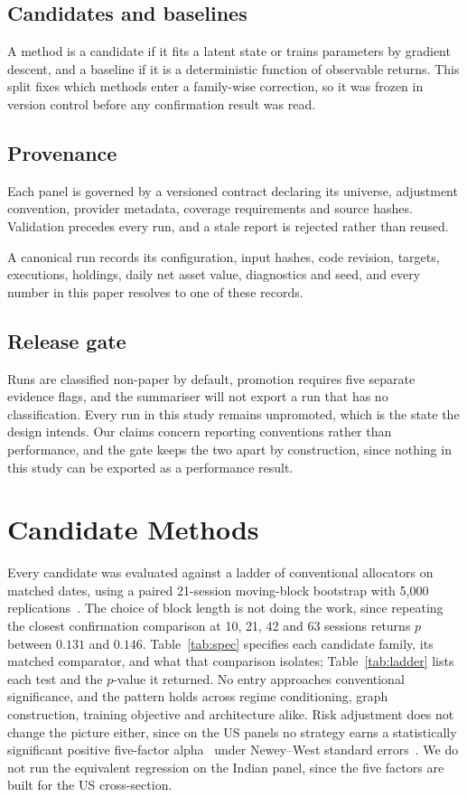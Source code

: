 \documentclass[sigconf,nonacm]{acmart}
\begin{document}
\subsection{Candidates and baselines}
A method is a candidate if it fits a latent
state or trains parameters by gradient descent, and a baseline if it is a
deterministic function of observable returns. This split fixes which methods
enter a family-wise correction, so it was frozen in version control before any
confirmation result was read.

\subsection{Provenance}
Each panel is governed by a versioned contract
declaring its universe, adjustment convention, provider metadata, coverage
requirements and source hashes. Validation precedes every run, and a stale
report is rejected rather than reused.

A canonical run records its
configuration, input hashes, code revision, targets, executions, holdings, daily
net asset value, diagnostics and seed, and every number in this paper resolves
to one of these records.

\subsection{Release gate}
Runs are classified non-paper by default, promotion requires five separate
evidence flags, and the summariser will not export a run that has no
classification. Every run in this study remains unpromoted, which is the state
the design intends. Our claims concern reporting conventions rather than
performance, and the gate keeps the two apart by construction, since nothing in
this study can be exported as a performance result.

\section{Candidate Methods}




Every candidate was evaluated against a ladder of conventional allocators on
matched dates, using a paired 21-session moving-block bootstrap with 5{,}000
replications~\cite{kunsch1989jackknife,politis1994stationary}. The choice of
block length is not doing the work, since repeating the closest confirmation
comparison at 10, 21, 42 and 63 sessions returns $p$ between $0.131$ and
$0.146$.
Table~\ref{tab:spec} specifies each candidate family, its matched comparator,
and what that comparison isolates; Table~\ref{tab:ladder} lists each test and
the $p$-value it returned. No entry
approaches conventional significance, and the pattern holds across regime
conditioning, graph construction, training objective and architecture alike.
Risk adjustment does not change the picture either, since on the US panels no
strategy earns a statistically significant positive five-factor
alpha~\cite{fama2015fivefactor} under Newey--West standard
errors~\cite{newey1987hac}. We do not run the equivalent regression on the
Indian panel, since the five factors are built for the US cross-section.
\end{document}
